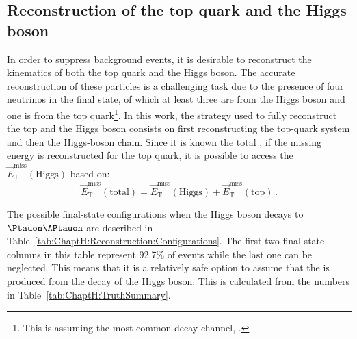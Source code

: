\subsection{Reconstruction of the top quark and the Higgs boson}
\label{sec:ChaptH:Sig:EventReconstruction} 
In order to suppress background events, it is desirable to reconstruct the 
kinematics of both the top quark and the Higgs boson. 
The accurate reconstruction of these particles is a challenging task 
due to the presence of four neutrinos in the final state, of which at least three 
are from the Higgs boson and one is from the top quark\footnote{This is 
assuming the most common decay channel, \Htautau.}. 
In this work, the strategy used to fully reconstruct the top and the Higgs boson consists on first
reconstructing the top-quark system and then the Higgs-boson chain. Since it is known
the total \MET, if the missing energy is reconstructed for the top quark, 
it is possible to access the $\overrightarrow{E}_{\text{T}}^{\text{miss}} (\text{Higgs})$ based on:
\begin{equation*}
	\overrightarrow{E}_{\text{T}}^{\text{miss}} (\text{total}) = \overrightarrow{E}_{\text{T}}^{\text{miss}} (\text{Higgs}) + \overrightarrow{E}_{\text{T}}^{\text{miss}} (\text{top}) \,.
\end{equation*}

The possible final-state configurations when the Higgs boson decays to $\Ptauon \APtauon$ are described in Table~\ref{tab:ChaptH:Reconstruction:Configurations}.
The first two final-state columns in this table represent 92.7\% of \Htautau events 
while the last one can be neglected. This means that it is a relatively safe option to assume that
the \tauhad is produced from the decay of the Higgs boson.
This is calculated from the numbers in Table~\ref{tab:ChaptH:TruthSummary}.


